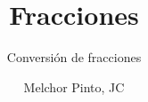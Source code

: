 \documentclass{guia}
\title{Fracciones}
\subtitle{Conversión de fracciones}
\author{Melchor Pinto, JC}
\begin{document}
%
\begin{questions}
\questionboxed{}
\end{questions}
\end{document}
